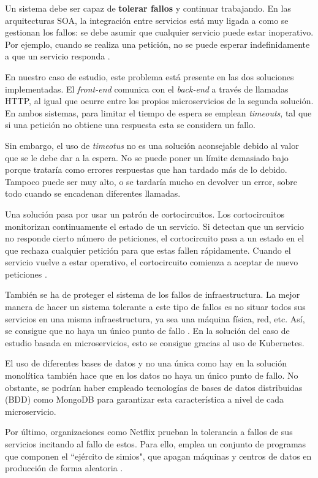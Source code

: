 \documentclass[11pt,spanish,listoffigures]{tfgetsinf}
\begin{document}
Un sistema debe ser capaz de \textbf{tolerar fallos} y continuar trabajando. En las arquitecturas SOA, la integración entre servicios está muy ligada a como se gestionan los fallos: se debe asumir que cualquier servicio puede estar inoperativo. Por ejemplo, cuando se realiza una petición, no se puede esperar indefinidamente a que un servicio responda \cite{Newman2015a}.

En nuestro caso de estudio, este problema está presente en las dos soluciones implementadas. El \textit{front-end} comunica con el \textit{back-end} a través de llamadas HTTP, al igual que ocurre entre los propios microservicios de la segunda solución. En ambos sistemas, para limitar el tiempo de espera se emplean \textit{timeouts}, tal que si una petición no obtiene una respuesta esta se considera un fallo.

Sin embargo, el uso de \textit{timeotus} no es una solución aconsejable debido al valor que se le debe dar a la espera. No se puede poner un límite demasiado bajo porque trataría como errores respuestas que han tardado más de lo debido. Tampoco puede ser muy alto, o se tardaría mucho en devolver un error, sobre todo cuando se encadenan diferentes llamadas.

Una solución pasa por usar un patrón de cortocircuitos. Los cortocircuitos monitorizan continuamente el estado de un servicio. Si detectan que un servicio no responde cierto número de peticiones, el cortocircuito pasa a un estado en el que rechaza cualquier petición para que estas fallen rápidamente. Cuando el servicio vuelve a estar operativo, el cortocircuito comienza a aceptar de nuevo peticiones \cite{Richards2016}.

También se ha de proteger el sistema de los fallos de infraestructura. La mejor manera de hacer un sistema tolerante a este tipo de fallos es no situar todos sus servicios en una misma infraestructura, ya sea una máquina física, red, etc. Así, se consigue que no haya un único punto de fallo \cite{Newman2015a}. En la solución del caso de estudio basada en microservicios, esto se consigue gracias al uso de Kubernetes.

El uso de diferentes bases de datos y no una única como hay en la solución monolítica también hace que en los datos no haya un único punto de fallo. No obstante, se podrían haber empleado tecnologías de bases de datos distribuidas (BDD) como MongoDB para garantizar esta característica a nivel de cada microservicio.

Por último, organizaciones como Netflix prueban la tolerancia a fallos de sus servicios incitando al fallo de estos. Para ello, emplea un conjunto de programas que componen el ``ejército de simios", que apagan máquinas y centros de datos en producción de forma aleatoria \cite{Lewis2014}.
\end{document}
